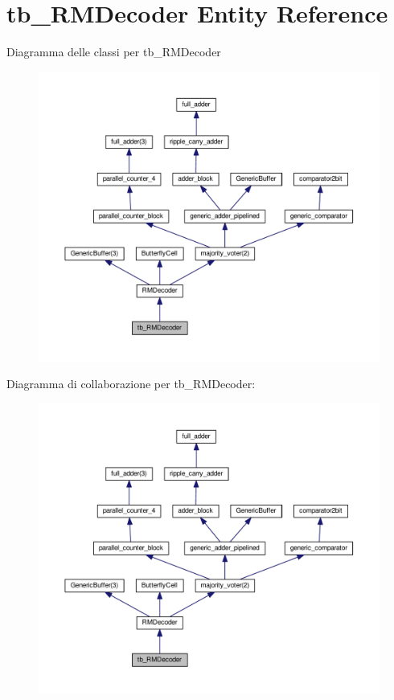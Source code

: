 \hypertarget{classtb___r_m_decoder}{\section{tb\+\_\+\+R\+M\+Decoder Entity Reference}
\label{classtb___r_m_decoder}
}


Diagramma delle classi per tb\+\_\+\+R\+M\+Decoder\nopagebreak
\begin{figure}[H]
\begin{center}
\leavevmode
\includegraphics[width=350pt]{classtb___r_m_decoder__inherit__graph}
\end{center}
\end{figure}


Diagramma di collaborazione per tb\+\_\+\+R\+M\+Decoder\+:\nopagebreak
\begin{figure}[H]
\begin{center}
\leavevmode
\includegraphics[width=350pt]{classtb___r_m_decoder__coll__graph}
\end{center}
\end{figure}
